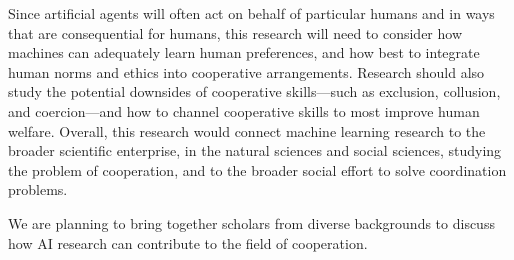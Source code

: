 \documentclass[11pt, a4paper, logo, onecolumn, nonumbering]{deepmind}
\begin{document}
Since artificial agents will often act on behalf of particular humans and in ways that are consequential for humans, this research will need to consider how machines can adequately learn human preferences, and how best to integrate human norms and ethics into cooperative arrangements. Research should also study the potential downsides of cooperative skills—such as exclusion, collusion, and coercion—and how to channel cooperative skills to most improve human welfare. Overall, this research would connect machine learning research to the broader scientific enterprise, in the natural sciences and social sciences, studying the problem of cooperation, and to the broader social effort to solve coordination problems.



We are planning to bring together scholars from diverse backgrounds to discuss how AI research can contribute to the field of cooperation.






\pagebreak
  



\end{document}
